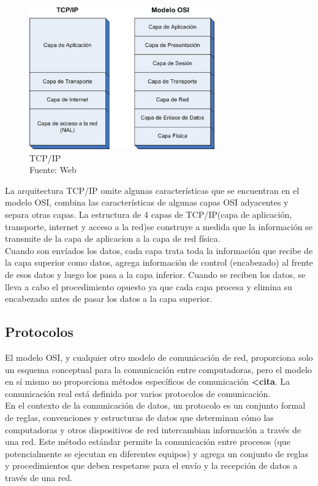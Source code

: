\begin{figure}[H]
    \begin{center}
        \includegraphics[width=8cm]{img/capitulo_2/tcp_ip_osi.jpg}
    \end{center}
    \caption{TCP/IP\\Fuente: Web}
    \label{fig:tcpip}
\end{figure}

La arquitectura TCP/IP omite algunas características que se encuentran en el modelo OSI, combina las características de algunas capas OSI adyacentes y separa otras capas. La estructura de 4 capas de TCP/IP(capa de aplicación, transporte, internet y acceso a la red)se construye a medida que la información se transmite de la capa de aplicacion a la capa de red física.\\

Cuando son envíados los datos, cada capa trata toda la información que recibe de la capa superior como datos, agrega información de control (encabezado) al frente de esos datos y luego los pasa a la capa inferior. Cuando se reciben los datos, se lleva a cabo el procedimiento opuesto ya que cada capa procesa y elimina su encabezado antes de pasar los datos a la capa superior.\\

\subsection{Protocolos}
El modelo OSI, y cualquier otro modelo de comunicación de red, proporciona solo un esquema conceptual para la comunicación entre computadoras, pero el modelo en sí mismo no proporciona métodos específicos de comunicación \textbf{<cita}. La comunicación real está definida por varios protocolos de comunicación.\\

En el contexto de la comunicación de datos, un protocolo es un conjunto formal de reglas, convenciones y estructuras de datos que determinan cómo las computadoras y otros dispositivos de red intercambian información a través de una red. Este método estándar permite la comunicación entre procesos (que potencialmente se ejecutan en diferentes equipos) y agrega un conjunto de reglas y procedimientos que deben respetarse para el envío y la recepción de datos a través de una red.\\

